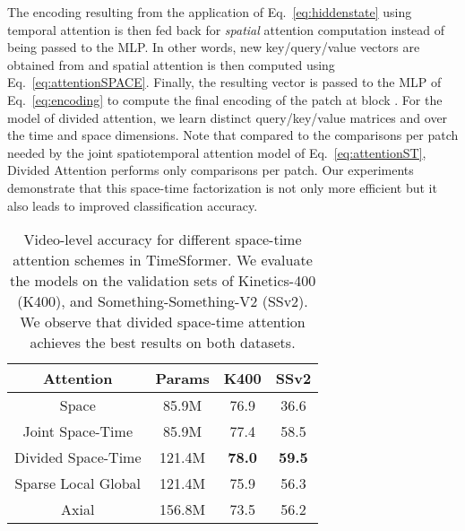 \documentclass{article}
\begin{document}
The encoding  resulting from the application of Eq.~\ref{eq:hiddenstate} using temporal attention is then fed back for {\em spatial} attention computation instead of being passed to the MLP. In other words, new key/query/value vectors are obtained from  and spatial attention is then computed using Eq.~\ref{eq:attentionSPACE}. Finally, the resulting vector  is passed to the MLP of Eq.~\ref{eq:encoding} to compute the final encoding  of the patch at block . For the model of divided attention, we learn distinct query/key/value matrices  and  over the time and space dimensions. Note that compared to the  comparisons per patch needed by the joint spatiotemporal attention model of Eq.~\ref{eq:attentionST}, Divided Attention performs only  comparisons per patch. Our experiments demonstrate that this space-time factorization is not only more efficient but it also leads to improved classification accuracy. 




\begin{table}[t]
\scriptsize
\begin{center}
\begin{tabular}{ c c   c  c } 
 \hline
 Attention & Params & K400 & SSv2\\ \hline
Space & 85.9M &  76.9 & 36.6 \\
Joint Space-Time & 85.9M & 77.4 & 58.5 \\
Divided Space-Time & 121.4M &  \bf 78.0 & \bf 59.5\\
Sparse Local Global & 121.4M &  75.9 & 56.3 \\
Axial & 156.8M & 73.5 & 56.2 \\
\hline
\end{tabular}
\end{center}
\vspace{-0.2cm}
\caption{Video-level accuracy for different space-time attention schemes in TimeSformer. We evaluate the models on the validation sets of Kinetics-400 (K400), and Something-Something-V2 (SSv2). We observe that divided space-time attention achieves the best results on both datasets.\vspace{-0.3cm}} \label{att_results_table}
\end{table}
\end{document}
